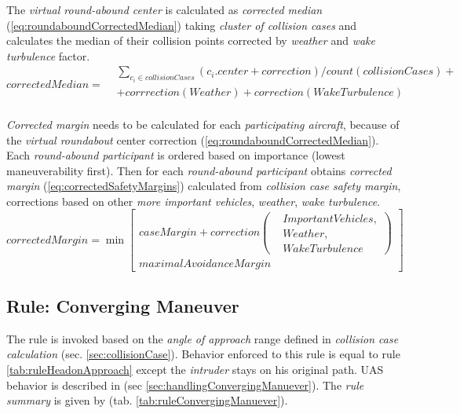\noindent The \emph{virtual round-abound center} is calculated as \emph{corrected median} (\ref{eq:roundaboundCorrectedMedian}) taking \emph{cluster of collision cases} and calculates the median of their collision points corrected by \emph{weather} and \emph{wake turbulence} factor.
\begin{equation}\label{eq:roundaboundCorrectedMedian}
    correctedMedian=
    \begin{aligned}
    &\sum_{c_i\in collisionCases}\left(c_i.center+correction\right)/count(collisionCases) + \\
    &+ corrrection(Weather) + correction(WakeTurbulence)\\
    \end{aligned}
\end{equation}

\noindent \emph{Corrected margin} needs to be calculated for each \emph{participating aircraft}, because of the \emph{virtual roundabout} center correction (\ref{eq:roundaboundCorrectedMedian}).
Each \emph{round-abound participant} is ordered based on importance (lowest maneuverability first). Then for each  \emph{round-abound participant} obtains \emph{corrected margin} (\ref{eq:correctedSafetyMargins}) calculated from \emph{collision case safety margin}, corrections based on other \emph{more important vehicles}, \emph{weather}, \emph{wake turbulence}.
\begin{equation}\label{eq:correctedSafetyMargins}
    correctedMargin =\min \begin{bmatrix} 
        caseMargin + correction\left(\begin{aligned}&ImportantVehicles,\\&Weather,\\&WakeTurbulence\end{aligned}\right)\\
        maximalAvoidanceMargin
    \end{bmatrix}
\end{equation}


\subsection{Rule: Converging Maneuver}\label{sec:ruleConvergingManuever}
\noindent The rule is invoked based on the \emph{angle of approach} range defined in \emph{collision case calculation} (sec. \ref{sec:collisionCase}). Behavior enforced to this rule is equal to rule \ref{tab:ruleHeadonApproach} except the \emph{intruder} stays on his original path. UAS behavior is described in (sec \ref{sec:handlingConvergingManuever}). The \emph{rule summary} is given by (tab. \ref{tab:ruleConvergingManuever}).

